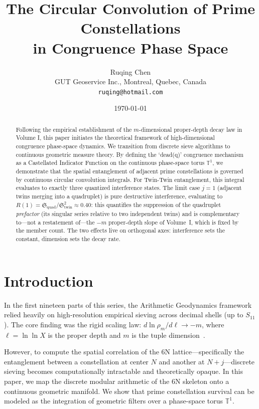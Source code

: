 \documentclass[11pt,a4paper]{article}
\title{\Large \textbf{The Circular Convolution of Prime Constellations\\ in Congruence Phase Space}}
\author{Ruqing Chen\\
\small GUT Geoservice Inc., Montreal, Quebec, Canada\\
\small \texttt{ruqing@hotmail.com}}
\date{\today}
\begin{document}
\maketitle

\begin{abstract}
Following the empirical establishment of the $m$-dimensional proper-depth decay law in Volume I, this paper initiates the theoretical framework of high-dimensional congruence phase-space dynamics. We transition from discrete sieve algorithms to continuous geometric measure theory. By defining the `dead(q)' congruence mechanism as a Castellated Indicator Function on the continuous phase-space torus $\mathbb{T}^1$, we demonstrate that the spatial entanglement of adjacent prime constellations is governed by continuous circular convolution integrals. For Twin-Twin entanglement, this integral evaluates to exactly three quantized interference states. The limit case $j=1$ (adjacent twins merging into a quadruplet) is pure destructive interference, evaluating to $R(1)=\mathfrak{S}_{\text{quad}}/\mathfrak{S}_{\text{twin}}^2\approx0.40$: this quantifies the suppression of the quadruplet \emph{prefactor} (its singular series relative to two independent twins) and is complementary to---not a restatement of---the $-m$ proper-depth slope of Volume~I, which is fixed by the member count. The two effects live on orthogonal axes: interference sets the constant, dimension sets the decay rate.
\end{abstract}

\section{Introduction}
In the first nineteen parts of this series, the Arithmetic Geodynamics framework relied heavily on high-resolution empirical sieving across decimal shells (up to $S_{11}$). The core finding was the rigid scaling law: $d\ln\rho_m / d\ell \to -m$, where $\ell = \ln\ln X$ is the proper depth and $m$ is the tuple dimension~\cite{ChenXVII,ChenXIX,Review}. 

However, to compute the spatial correlation of the 6N lattice---specifically the entanglement between a constellation at center $N$ and another at $N+j$---discrete sieving becomes computationally intractable and theoretically opaque. In this paper, we map the discrete modular arithmetic of the 6N skeleton onto a continuous geometric manifold. We show that prime constellation survival can be modeled as the integration of geometric filters over a phase-space torus $\mathbb{T}^1$.
\end{document}
